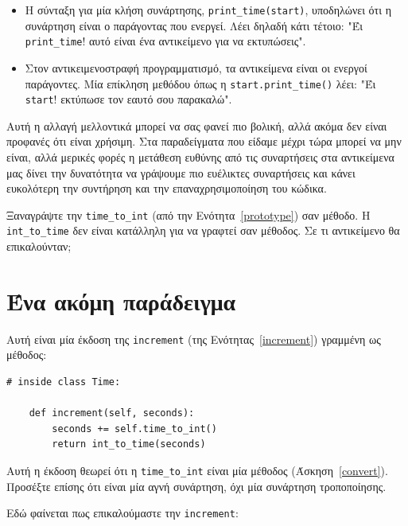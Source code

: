 \documentclass[10pt]{book}
\begin{document}
\begin{itemize}

 
\item Η σύνταξη για μία κλήση συνάρτησης, \verb"print_time(start)", υποδηλώνει ότι η συνάρτηση είναι ο παράγοντας 
  που ενεργεί. Λέει δηλαδή κάτι τέτοιο: "Έι \verb"print_time"! αυτό είναι ένα αντικείμενο για να εκτυπώσεις". 

\item Στον αντικειμενοστραφή προγραμματισμό, τα αντικείμενα είναι οι ενεργοί παράγοντες. Μία επίκληση μεθόδου όπως η  
  \verb"start.print_time()" λέει: "Έι {\tt start}! εκτύπωσε τον εαυτό σου παρακαλώ".

\end{itemize}

Αυτή η αλλαγή μελλοντικά μπορεί να σας φανεί πιο βολική, αλλά ακόμα δεν είναι προφανές ότι είναι χρήσιμη.
Στα παραδείγματα που είδαμε μέχρι τώρα μπορεί να μην είναι, αλλά μερικές φορές η μετάθεση ευθύνης από τις
συναρτήσεις στα αντικείμενα μας δίνει την δυνατότητα να γράψουμε πιο ευέλικτες συναρτήσεις και κάνει
ευκολότερη την συντήρηση και την επαναχρησιμοποίηση του κώδικα.
\\
\begin{exercise}
\label{convert}

Ξαναγράψτε την \verb"time_to_int" (από την Ενότητα~\ref{prototype}) σαν μέθοδο. Η \verb"int_to_time"
δεν είναι κατάλληλη για να γραφτεί σαν μέθοδος. Σε τι αντικείμενο θα επικαλούνταν;
\end{exercise}


 
\section{Ένα ακόμη παράδειγμα}

Αυτή είναι μία έκδοση της {\tt increment} (της Ενότητας~\ref{increment})
γραμμένη ως μέθοδος:

\begin{verbatim}
# inside class Time:

    def increment(self, seconds):
        seconds += self.time_to_int()
        return int_to_time(seconds)
\end{verbatim}
%
Αυτή η έκδοση θεωρεί ότι η \verb"time_to_int" είναι μία μέθοδος (Άσκηση~\ref{convert}).
Προσέξτε επίσης ότι είναι μία αγνή συνάρτηση, όχι μία συνάρτηση τροποποίησης. 

Εδώ φαίνεται πως επικαλούμαστε την {\tt increment}:
\end{document}

